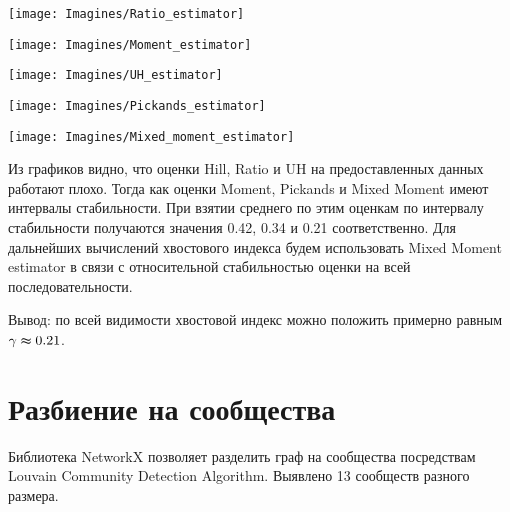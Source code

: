 \documentclass[a4paper,12pt]{article}
\begin{document}
\begin{center}
\centering 
\texttt{[image: Imagines/Ratio\_estimator]}
\end{center}

\begin{center}
\centering 
\texttt{[image: Imagines/Moment\_estimator]}
\end{center}

\begin{center}
\centering 
\texttt{[image: Imagines/UH\_estimator]}
\end{center}

\begin{center}
\centering 
\texttt{[image: Imagines/Pickands\_estimator]}
\end{center}

\begin{center}
\centering 
\texttt{[image: Imagines/Mixed\_moment\_estimator]}
\end{center}

Из графиков видно, что оценки Hill, Ratio и UH на предоставленных данных работают плохо. Тогда как оценки Moment, Pickands и Mixed Moment имеют интервалы стабильности. При взятии среднего по этим оценкам по интервалу стабильности получаются значения 0.42, 0.34 и 0.21 соответственно. Для дальнейших вычислений хвостового индекса будем использовать Mixed Moment estimator в связи с относительной стабильностью оценки на всей последовательности.

Вывод: по всей видимости хвостовой индекс можно положить примерно равным $\gamma \thickapprox 0.21$.    



\section{Разбиение на сообщества}
Библиотека NetworkX позволяет разделить граф на сообщества посредствам Louvain Community Detection Algorithm. Выявлено 13 сообществ разного размера.
\end{document}
